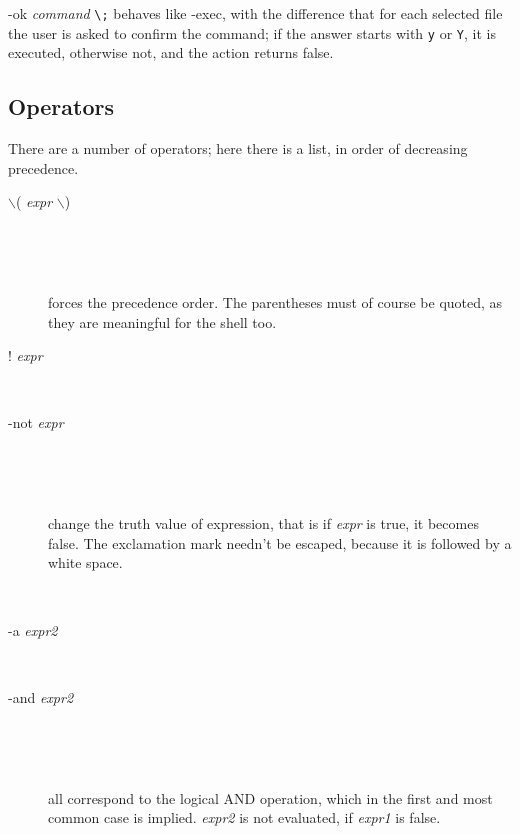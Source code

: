 \begin{itemize}
{\sf -ok {\em command\/} \verb-\;-} behaves like -exec, with the
difference that for each selected file the user is asked to confirm the
command; if the answer starts with {\tt y} or {\tt Y}, it is executed,
otherwise not, and the action returns false.

\end{itemize}

\subsection{Operators}

There are a number of operators; here there is a list, in order of
decreasing precedence.

\begin{description}

\item[{\sf $\backslash$( {\em expr\/} $\backslash$)}]
~\vspace{-\itemsep}\vspace{-\itemsep}
\item[~]
forces the precedence order. The parentheses must of course be quoted, as
they are meaningful for the shell too.

\item[{\sf ! {\em expr\/}}]
~\vspace{-\itemsep}\vspace{-\itemsep}
\item[{\sf -not {\em expr\/}}] 
~\vspace{-\itemsep}\vspace{-\itemsep}
\item[~]
change the truth value
of expression, that is if {\em expr\/} is true, it becomes false. The
exclamation mark needn't be escaped, because it is followed by a white
space.

\item[{ }]
~\vspace{-\itemsep}\vspace{-\itemsep}
\item[{ -a {\em expr2\/} }]
~\vspace{-\itemsep}\vspace{-\itemsep}
\item[{ -and {\em expr2\/} }] 
~\vspace{-\itemsep}\vspace{-\itemsep}
\item[~] all correspond to the
logical AND operation, which in the first and most common case is implied.
{\em expr2\/} is not evaluated, if {\em expr1\/} is false.


\end{description}
